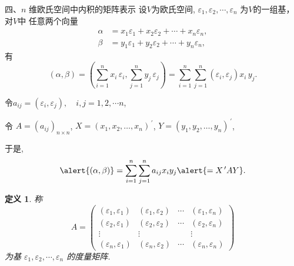 \documentclass[13pt]{beamer}
\newtheorem*{defi}{定义}
\begin{document}
\begin{frame}
{四、$n$ 维欧氏空间中内积的矩阵表示}
设$V$为欧氏空间, $\varepsilon_{1}, \varepsilon_{2}, \cdots, \varepsilon_{n}$ 为$V$的一组基，对$V$中
任意两个向量
\begin{align*}
\alpha & = x_{1} \varepsilon_{1}+x_{2} \varepsilon_{2}+\cdots+x_{n} \varepsilon_{n},\\
\beta  & = y_{1} \varepsilon_{1}+y_{2} \varepsilon_{2}+\cdots+y_{n} \varepsilon_{n},
\end{align*}
有
$$
(\alpha, \beta)
=\left(\sum_{i=1}^{n} x_{i} \, \varepsilon_{i}, \sum_{j=1}^{n} y_{j} \, \varepsilon_{j}\right)
=\sum_{i=1}^{n} \sum_{j=1}^{n}\left(\varepsilon_{i}, \varepsilon_{j}\right) x_{i}\, y_{j}.$$
\end{frame}


\begin{frame}

令$ a_{i j}=\left(\varepsilon_{i}, \varepsilon_{j}\right), \quad i, j=1,2, \cdots n$, 

令
$A=\left(a_{i j} \right)_{n \times n}$,
$X= \left(x_1, x_2, \dots, x_n \right)^{\, \prime}$, 
$Y=\left(y_1, y_2, \dots, y_n \right)^{\, \prime}$,

于是,
$$\alert{(\alpha, \beta)}=\sum_{i=1}^{n} \sum_{j=1}^{n} a_{i j} x_{i} y_{j} \alert{=X^{\, \prime} A Y}.$$

\begin{defi}
称$$A=
\left(\begin{array}{cccc}
\left(\varepsilon_{1}, \varepsilon_{1}\right) & \left(\varepsilon_{1}, \varepsilon_{2}\right) & \cdots & \left(\varepsilon_{1}, \varepsilon_{n}\right) \\ 
\left(\varepsilon_{2}, \varepsilon_{1}\right) & \left(\varepsilon_{2}, \varepsilon_{2}\right) & \cdots & \left(\varepsilon_{2}, \varepsilon_{n}\right) \\
\vdots & \vdots &  & \vdots \\ 
\left(\varepsilon_{n}, \varepsilon_{1}\right)  & \left(\varepsilon_{n}, \varepsilon_{2}\right) & \cdots & \left(\varepsilon_{n}, \varepsilon_{n}\right)
\end{array}\right)$$
为基 $\varepsilon_{1}, \varepsilon_{2}, \cdots, \varepsilon_{n}$ 的度量矩阵.
\end{defi}


\end{frame}
\end{document}
